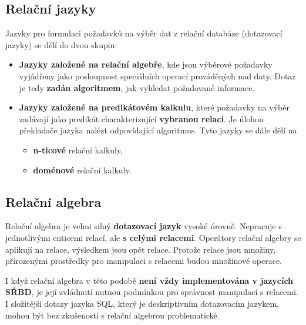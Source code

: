 \subsection{Relační jazyky}
Jazyky pro formulaci požadavků na výběr dat z relační databáze (dotazovací jazyky) se dělí do dvou skupin:
\begin{itemize}
\item \textbf{Jazyky založené na  relační algebře}, kde jsou výběrové požadavky vyjádřeny jako posloupnost speciálních operací prováděných nad daty. Dotaz je tedy  \textbf{zadán algoritmem}, jak vyhledat požadované informace.
\item \textbf{Jazyky založené na  predikátovém kalkulu}, které požadavky na výběr zadávají jako predikát charakterizující \textbf{vybranou relaci}. Je úlohou překladače jazyka nalézt odpovídající algoritmus. Tyto jazyky se dále dělí na 
\begin{itemize}
	\item \textbf{n-ticové} relační kalkuly,
	\item \textbf{doménové} relační kalkuly. 
\end{itemize}
\end{itemize}

\subsection{Relační algebra}
Relační algebra je velmi silný \textbf{dotazovací jazyk} vysoké úrovně. Nepracuje s jednotlivými enticemi relací, ale \textbf{s celými relacemi}. Operátory relační algebry se aplikují na relace, výsledkem jsou opět relace. Protože relace jsou množiny, přirozenými prostředky pro manipulaci s relacemi budou množinové operace.

I když relační algebra v této podobě \textbf{není vždy implementována v jazycích SŘBD}, je její zvládnutí nutnou podmínkou pro správnost manipulací s relacemi. I složitější dotazy jazyka SQL, který je deskriptivním dotazovacím jazykem, mohou být bez zkušeností s relační algebrou problematické. 

